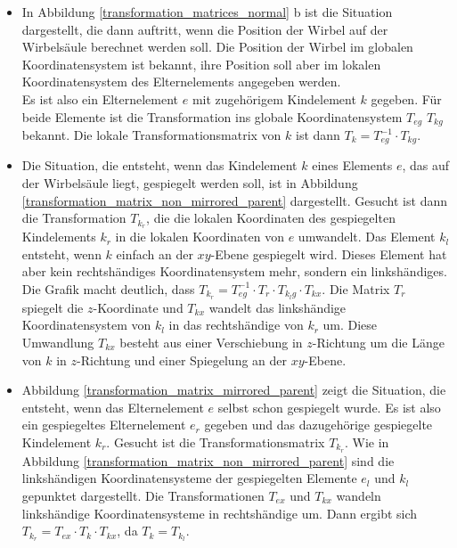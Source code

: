\begin{itemize}
 \item In Abbildung \ref{transformation_matrices_normal} b ist die Situation dargestellt, die \ua dann auftritt, wenn die Position der Wirbel auf der Wirbelsäule berechnet werden soll. Die Position der Wirbel im globalen Koordinatensystem ist bekannt, ihre Position soll aber im lokalen Koordinatensystem des Elternelements angegeben werden.\\
 Es ist also ein Elternelement $e$ mit zugehörigem Kindelement $k$ gegeben. Für beide Elemente ist die Transformation ins globale Koordinatensystem $T_{eg}$ \bzw $T_{kg}$ bekannt. Die lokale Transformationsmatrix von $k$ ist dann $T_k = T^{-1}_{eg} \cdot T_{kg}$.
 
 \item Die Situation, die entsteht, wenn das Kindelement $k$ eines Elements $e$, das auf der Wirbelsäule liegt, gespiegelt werden soll, ist in Abbildung \ref{transformation_matrix_non_mirrored_parent} dargestellt. Gesucht ist dann die Transformation $T_{k_r}$, die die lokalen Koordinaten des gespiegelten Kindelements $k_r$ in die lokalen Koordinaten von $e$ umwandelt. Das Element $k_l$ entsteht, wenn $k$ einfach an der $xy$-Ebene gespiegelt wird. Dieses Element hat aber kein rechtshändiges Koordinatensystem mehr, sondern ein linkshändiges. Die Grafik macht deutlich, dass $T_{k_r} = T_{eg}^{-1} \cdot T_r \cdot T_{k_lg} \cdot T_{kx}$. Die Matrix $T_r$ spiegelt die $z$-Koordinate und $T_{kx}$ wandelt das linkshändige Koordinatensystem von $k_l$ in das rechtshändige von $k_r$ um. Diese Umwandlung $T_{kx}$ besteht aus einer Verschiebung in $z$-Richtung um die Länge von $k$ in $z$-Richtung und einer Spiegelung an der $xy$-Ebene.
 
 \item Abbildung \ref{transformation_matrix_mirrored_parent} zeigt die Situation, die entsteht, wenn das Elternelement $e$ selbst schon gespiegelt wurde. 
 Es ist also ein gespiegeltes Elternelement $e_r$ gegeben und das dazugehörige gespiegelte Kindelement $k_r$. Gesucht ist die Transformationsmatrix $T_{k_r}$. Wie in Abbildung \ref{transformation_matrix_non_mirrored_parent} sind die linkshändigen Koordinatensysteme der gespiegelten Elemente $e_l$ und $k_l$ gepunktet dargestellt. Die Transformationen $T_{ex}$ und $T_{kx}$ wandeln linkshändige Koordinatensysteme in rechtshändige um. Dann ergibt sich \mbox{$T_{k_r} = T_{ex} \cdot T_k \cdot T_{kx}$}, da $T_k = T_{k_l}$.
\end{itemize}

